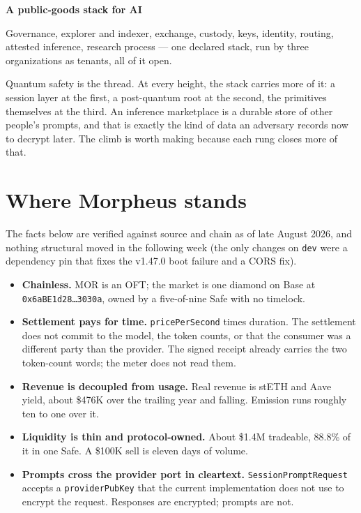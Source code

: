 \documentclass[11pt,a4paper]{article}
\newcommand{\code}[1]{\texttt{\small #1}}
\newcommand{\lift}[1]{{\color{muted}\footnotesize\sffamily #1}}
\newcommand{\height}[2]{\vspace{0.9ex}\noindent\textbf{#1}\quad\lift{#2}\par\nopagebreak\vspace{0.2ex}}
\begin{document}
\height{A public-goods stack for AI}{the whole estate}
Governance, explorer and indexer, exchange, custody, keys, identity, routing, attested inference,
research process --- one declared stack, run by three organizations as tenants, all of it open.

\vspace{0.6ex}
\noindent Quantum safety is the thread. At every height, the stack carries more of it: a session layer at
the first, a post-quantum root at the second, the primitives themselves at the third. An inference
marketplace is a durable store of other people's prompts, and that is exactly the kind of data an
adversary records now to decrypt later. The climb is worth making because each rung closes more of that.

\section{Where Morpheus stands}

The facts below are verified against source and chain as of late August 2026, and nothing structural
moved in the following week (the only changes on \code{dev} were a dependency pin that fixes the
v1.47.0 boot failure and a CORS fix).

\begin{itemize}
\item \textbf{Chainless.} MOR is an OFT; the market is one diamond on Base at
      \code{0x6aBE1d28\ldots3030a}, owned by a five-of-nine Safe with no timelock.
\item \textbf{Settlement pays for time.} \code{pricePerSecond} times duration. The settlement does not
      commit to the model, the token counts, or that the consumer was a different party than the provider.
      The signed receipt already carries the two token-count words; the meter does not read them.
\item \textbf{Revenue is decoupled from usage.} Real revenue is stETH and Aave yield, about \$476K over the
      trailing year and falling. Emission runs roughly ten to one over it.
\item \textbf{Liquidity is thin and protocol-owned.} About \$1.4M tradeable, 88.8\% of it in one Safe. A
      \$100K sell is eleven days of volume.
\item \textbf{Prompts cross the provider port in cleartext.} \code{SessionPromptRequest} accepts a
      \code{providerPubKey} that the current implementation does not use to encrypt the request. Responses
      are encrypted; prompts are not.
\end{itemize}
\end{document}

